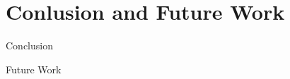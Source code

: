 \section{Conlusion and Future Work}
  \begin{frame}{Conclusion}
  \end{frame}

  \begin{frame}{Future Work}
  \end{frame}

